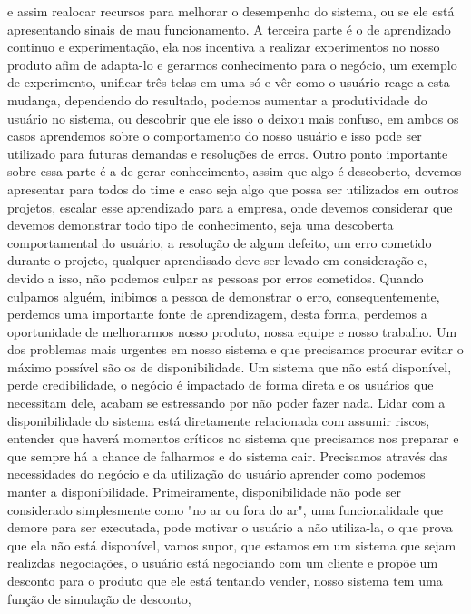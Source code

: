   e assim realocar recursos para melhorar o desempenho do sistema, ou se ele está
  apresentando sinais de mau funcionamento. A terceira parte é o de aprendizado
  continuo e experimentação, ela nos incentiva a realizar experimentos no nosso
  produto afim de adapta-lo e gerarmos conhecimento para o negócio, um exemplo de
  experimento, unificar três telas em uma só e vêr como o usuário reage a esta
  mudança, dependendo do resultado, podemos aumentar a produtividade do usuário
  no sistema, ou descobrir que ele isso o deixou mais confuso, em ambos os casos
  aprendemos sobre o comportamento do nosso usuário e isso pode ser utilizado para
  futuras demandas e resoluções de erros. Outro ponto importante sobre essa parte
  é a de gerar conhecimento, assim que algo é descoberto, devemos apresentar para
  todos do time e caso seja algo que possa ser utilizados em outros projetos,
  escalar esse aprendizado para a empresa, onde devemos considerar que devemos
  demonstrar todo tipo de conhecimento, seja uma descoberta comportamental do usuário,
  a resolução de algum defeito, um erro cometido durante o projeto, qualquer
  aprendisado deve ser levado em consideração e, devido a isso, não podemos culpar
  as pessoas por erros cometidos. Quando culpamos alguém, inibimos a pessoa de
  demonstrar o erro, consequentemente, perdemos uma importante fonte de aprendizagem,
  desta forma, perdemos a oportunidade de melhorarmos nosso produto, nossa equipe
  e nosso trabalho. \newline
  Um dos problemas mais urgentes em nosso sistema e que precisamos procurar evitar
  o máximo possível são os de disponibilidade. Um sistema que não está disponível,
  perde credibilidade, o negócio é impactado de forma direta e os usuários que
  necessitam dele, acabam se estressando por não poder fazer nada. Lidar com a
  disponibilidade do sistema está diretamente relacionada com assumir riscos,
  entender que haverá momentos críticos no sistema que precisamos nos preparar e
  que sempre há a chance de falharmos e do sistema cair. Precisamos através das
  necessidades do negócio e da utilização do usuário aprender como podemos manter
  a disponibilidade. Primeiramente, disponibilidade não pode ser considerado
  simplesmente como "no ar ou fora do ar", uma funcionalidade que demore para ser
  executada, pode motivar o usuário a não utiliza-la, o que prova que ela não está
  disponível, vamos supor, que estamos em um sistema que sejam realizdas negociações,
  o usuário está negociando com um cliente e propõe um desconto para o produto que
  ele está tentando vender, nosso sistema tem uma função de simulação de desconto,

